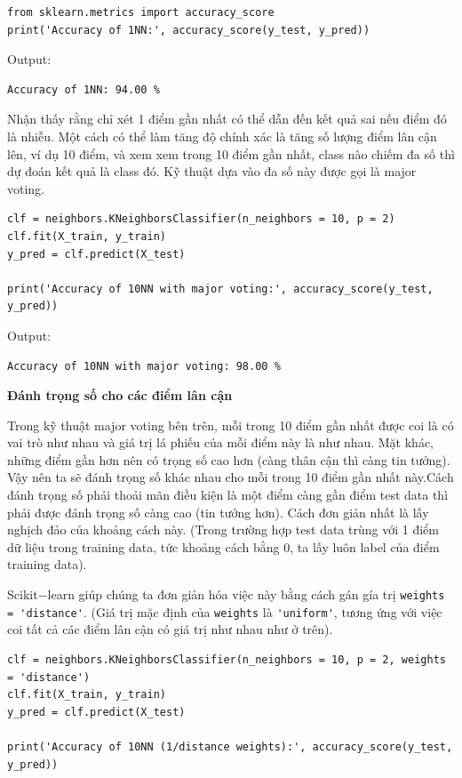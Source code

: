 \documentclass{article}
\begin{document}
\begin{lstlisting}
from sklearn.metrics import accuracy_score
print('Accuracy of 1NN:', accuracy_score(y_test, y_pred))
\end{lstlisting}

Output:

\begin{lstlisting}
Accuracy of 1NN: 94.00 %
\end{lstlisting}

Nhận thấy rằng chỉ xét 1 điểm gần nhất có thể dẫn đến kết quả sai nếu điểm đó là nhiễu. Một cách có thể làm tăng độ chính xác là tăng số lượng điểm lân cận lên, ví dụ 10 điểm, và xem xem trong 10 điểm gần nhất, class nào chiếm đa số thì dự đoán kết quả là class đó. Kỹ thuật dựa vào đa số này được gọi là major voting.

\begin{lstlisting}
clf = neighbors.KNeighborsClassifier(n_neighbors = 10, p = 2)
clf.fit(X_train, y_train)
y_pred = clf.predict(X_test)

print('Accuracy of 10NN with major voting:', accuracy_score(y_test, y_pred))
\end{lstlisting}

Output:

\begin{lstlisting}
Accuracy of 10NN with major voting: 98.00 %
\end{lstlisting}

\textbf{Đánh trọng số cho các điểm lân cận}

Trong kỹ thuật major voting bên trên, mỗi trong 10 điểm gần nhất được coi là có vai trò như nhau và giá trị lá phiếu của mỗi điểm này là như nhau. Mặt khác, những điểm gần hơn nên có trọng số cao hơn (càng thân cận thì càng tin tưởng). Vậy nên ta sẽ đánh trọng số khác nhau cho mỗi trong 10 điểm gần nhất này.Cách đánh trọng số phải thoải mãn điều kiện là một điểm càng gần điểm test data thì phải được đánh trọng số càng cao (tin tưởng hơn). Cách đơn giản nhất là lấy nghịch đảo của khoảng cách này. (Trong trường hợp test data trùng với 1 điểm dữ liệu trong training data, tức khoảng cách bằng 0, ta lấy luôn label của điểm training data).

Scikit$-$learn giúp chúng ta đơn giản hóa việc này bằng cách gán gía trị \lstinline{weights = 'distance'}. (Giá trị mặc định của \lstinline{weights} là \lstinline{'uniform'}, tương ứng với việc coi tất cả các điểm lân cận có giá trị như nhau như ở trên).

\begin{lstlisting}
clf = neighbors.KNeighborsClassifier(n_neighbors = 10, p = 2, weights = 'distance')
clf.fit(X_train, y_train)
y_pred = clf.predict(X_test)

print('Accuracy of 10NN (1/distance weights):', accuracy_score(y_test, y_pred))
\end{lstlisting}
\end{document}
